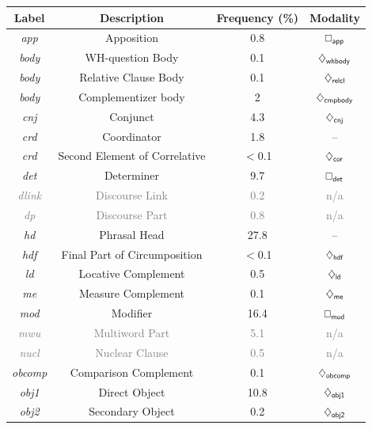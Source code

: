\begin{table}
	\centering
	\begin{tabularx}{0.925\textwidth}{@{}cccc@{}}
	      \textbf{Label} & \textbf{Description} & \textbf{Frequency} (\%) & \textbf{Modality}\\
	      \toprule
	      \textit{app} & Apposition & 0.8 & $\dbox{app}$\\
	      \textit{body} & WH-question Body & 0.1 & $\ddia{whbody}$\\
	      \textit{body} & Relative Clause Body &0.1& $\ddia{relcl}$\\
	      \textit{body} & Complementizer body & 2 & $\ddia{cmpbody}$\\
	      \textit{cnj} & Conjunct &4.3& $\ddia{cnj}$\\
	      \textit{crd} & Coordinator &1.8& --\\
	      \textit{crd} & Second Element of Correlative 	& $<$0.1 & $\ddia{cor}$\\
	      \textit{det} & Determiner &9.7& $\dbox{det}$\\
	      \textcolor{gray}{\textit{dlink}} & \textcolor{gray}{Discourse Link} & \textcolor{gray}{0.2} & \textcolor{gray}{{\small n/a}}\\
	      \textcolor{gray}{\textit{dp}} & \textcolor{gray}{Discourse Part} & \textcolor{gray}{0.8} & \textcolor{gray}{{\small n/a}}\\
	      \textit{hd} & Phrasal Head & 27.8 & -- \\
	      \textit{hdf} & Final Part of Circumposition & $<$0.1 & $\ddia{hdf}$\\
	      \textit{ld} & Locative Complement &0.5& $\ddia{ld}$\\
	      \textit{me} & Measure Complement &0.1& $\ddia{me}$\\
	      \textit{mod} & Modifier &16.4& $\dbox{mod}$\\
	      \textcolor{gray}{\textit{mwu}} & \textcolor{gray}{Multiword Part} & \textcolor{gray}{5.1} & \textcolor{gray}{{\small n/a}}\\
	      \textcolor{gray}{\textit{nucl}} & \textcolor{gray}{Nuclear Clause} &\textcolor{gray}{0.5}& \textcolor{gray}{{\small n/a}}\\
	      \textit{obcomp} & Comparison Complement &0.1& $\ddia{obcomp}$\\      
	      \textit{obj1} & Direct Object &10.8& $\ddia{obj1}$\\
	      \textit{obj2} & Secondary Object &0.2& $\ddia{obj2}$\\

\end{tabularx}
\end{table}
